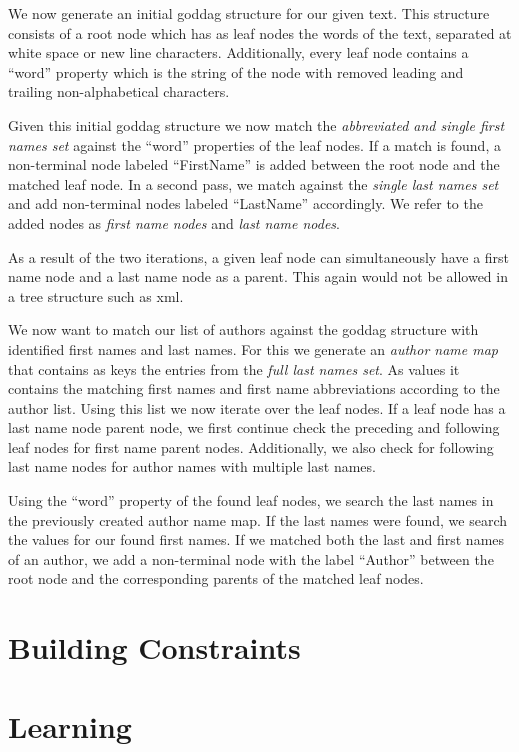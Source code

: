 We now generate an initial \gls{goddag} structure for our given text.
This structure consists of a root node which has as leaf nodes the words of the text, separated at white space or new line characters.
Additionally, every leaf node contains a ``word'' property which is the string of the node with removed leading and trailing non-alphabetical characters.

Given this initial \gls{goddag} structure we now match the \textit{abbreviated and single first names set} against the ``word'' properties of the leaf nodes.
If a match is found, a non-terminal node labeled ``FirstName'' is added between the root node and the matched leaf node.
In a second pass, we match against the \textit{single last names set} and add non-terminal nodes labeled ``LastName'' accordingly.
We refer to the added nodes as \textit{first name nodes} and \textit{last name nodes}.

As a result of the two iterations, a given leaf node can simultaneously have a first name node and a last name node as a parent.
This again would not be allowed in a tree structure such as \gls{xml}.

We now want to match our list of authors against the \gls{goddag} structure with identified first names and last names.
For this we generate an \textit{author name map} that contains as keys the entries from the \textit{full last names set}.
As values it contains the matching first names and first name abbreviations according to the author list.
Using this list we now iterate over the leaf nodes.
If a leaf node has a last name node parent node, we first continue check the preceding and following leaf nodes for first name parent nodes.
Additionally, we also check for following last name nodes for author names with multiple last names.

Using the ``word'' property of the found leaf nodes, we search the last names in the previously created author name map.
If the last names were found, we search the values for our found first names.
If we matched both the last and first names of an author, we add a non-terminal node with the label ``Author'' between the root node and the corresponding parents of the matched leaf nodes.


\section{Building  Constraints}\label{sec:i-training-crfs}

\section{Learning }\label{sec:i-learning-crfs}
